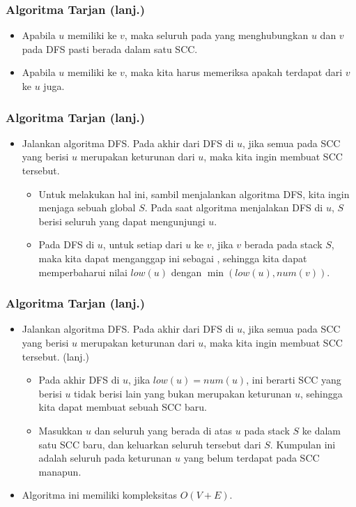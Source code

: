 \begin{frame}
\frametitle{Algoritma Tarjan (lanj.)}
\begin{itemize}
  \item Apabila \fnode $u$ memiliki \fbackedge ke \fnode $v$, maka seluruh \fnode pada \fpath yang menghubungkan \fnode $u$ dan \fnode $v$ pada DFS \ftree pasti berada dalam satu SCC.
  \item Apabila \fnode $u$ memiliki \fcrossedge ke \fnode $v$, maka kita harus memeriksa apakah terdapat \fpath dari \fnode $v$ ke \fnode $u$ juga.
\end{itemize}
\end{frame}

\begin{frame}
\frametitle{Algoritma Tarjan (lanj.)}
\begin{itemize}
  \item Jalankan algoritma DFS. Pada akhir dari DFS di \fnode $u$, jika semua \fnode pada SCC yang berisi \fnode $u$ merupakan keturunan dari \fnode $u$, maka kita ingin membuat SCC tersebut.
  \begin{itemize}
    \item Untuk melakukan hal ini, sambil menjalankan algoritma DFS, kita ingin menjaga sebuah \fstack global $S$. Pada saat algoritma menjalakan DFS di \fnode $u$, $S$ berisi seluruh \fnode yang dapat mengunjungi \fnode $u$.
    \item Pada DFS di \fnode $u$, untuk setiap \fcrossedge dari \fnode $u$ ke \fnode $v$, jika \fnode $v$ berada pada stack $S$, maka kita dapat menganggap \fedge ini sebagai \fbackedge, sehingga kita dapat memperbaharui nilai $low(u)$ dengan $\min(low(u), num(v))$.
  \end{itemize}
\end{itemize}
\end{frame}

\begin{frame}
\frametitle{Algoritma Tarjan (lanj.)}
\begin{itemize}
  \item Jalankan algoritma DFS. Pada akhir dari DFS di \fnode $u$, jika semua \fnode pada SCC yang berisi \fnode $u$ merupakan keturunan dari \fnode $u$, maka kita ingin membuat SCC tersebut. (lanj.)
  \begin{itemize}
    \item Pada akhir DFS di \fnode $u$, jika $low(u) = num(u)$, ini berarti SCC yang berisi \fnode $u$ tidak berisi \fnode lain yang bukan merupakan keturunan \fnode $u$, sehingga kita dapat membuat sebuah SCC baru.
    \item Masukkan \fnode $u$ dan seluruh \fnode yang berada di atas \fnode $u$ pada stack $S$ ke dalam satu SCC baru, dan keluarkan seluruh \fnode tersebut dari $S$. Kumpulan \fnode ini adalah seluruh \fnode pada keturunan \fnode $u$ yang belum terdapat pada SCC manapun.
  \end{itemize}
  \item Algoritma ini memiliki kompleksitas $O(V + E)$.
\end{itemize}
\end{frame}

